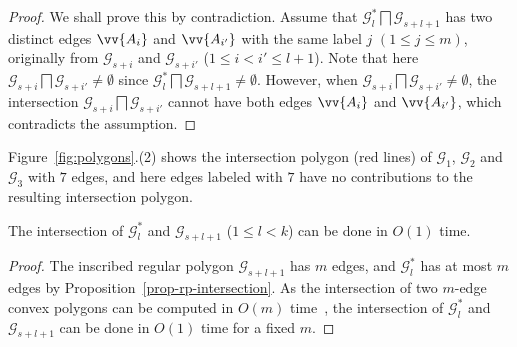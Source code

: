 

\begin{proof}
We shall prove this by contradiction.
Assume that $\mathcal{G}^*_{l} \bigsqcap \mathcal{G}_{s+l+1}$ has two distinct edges $\vv{A_i}$ and $\vv{A_{i'}}$  with the same label $j$ $(1\le j \le m)$, originally from
$\mathcal{G}_{s+i}$ and $\mathcal{G}_{s+i'}$  ($1\le i< i' \le l+1$).
%
Note that here $\mathcal{G}_{s+i} \bigsqcap \mathcal{G}_{s+i'} \ne \emptyset$ since $\mathcal{G}^*_l \bigsqcap \mathcal{G}_{s+l+1} \ne \emptyset$.
%
However, when $\mathcal{G}_{s+i} \bigsqcap \mathcal{G}_{s+i'} \ne \emptyset$, the intersection $\mathcal{G}_{s+i} \bigsqcap \mathcal{G}_{s+i'}$ cannot have
both edges $\vv{A_i}$ and $\vv{A_{i'}}$, which contradicts the assumption.
\end{proof}



Figure~\ref{fig:polygons}.(2) shows the intersection polygon (red lines) of $\mathcal{G}_1$, $\mathcal{G}_2$ and $\mathcal{G}_3$ with $7$ edges, and here edges labeled with $7$ have no contributions to the resulting intersection polygon.

\begin{prop}
\label{prop-cpi-time}
The intersection of $\mathcal{G}^*_l$ and $\mathcal{G}_{s+l+1}$ ($ 1\le l< k$) can be done in $O(1)$
time.
\end{prop}

\begin{proof}
The inscribed regular polygon $\mathcal{G}_{s+l+1}$ has $m$ edges, and  $\mathcal{G}^*_l$ has at most $m$ edges by Proposition~\ref{prop-rp-intersection}.
As the intersection of two $m$-edge convex polygons can be computed in $O(m)$ time~\cite{ORourke:Intersection}, the intersection of $\mathcal{G}^*_l$ and $\mathcal{G}_{s+l+1}$ can be done in $O(1)$ time for a fixed $m$.
\end{proof}





